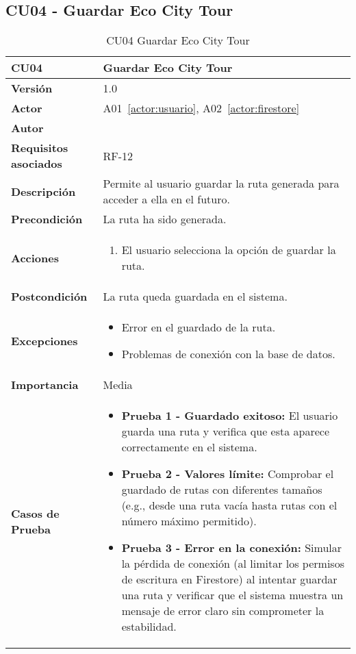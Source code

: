 \subsection{CU04 - Guardar Eco City Tour}
\begin{table}[H]
	\centering
	
	\begin{tabularx}{\linewidth}{ p{} p{} }
		\toprule
		\textbf{CU04}    & \textbf{Guardar Eco City Tour} \\
		\toprule
		\textbf{Versión}              & 1.0    \\
		\textbf{Actor}                & A01~\ref{actor:usuario}, A02~\ref{actor:firestore} \\
		\textbf{Autor}                & \autor \\
		\textbf{Requisitos asociados} & RF-12 \\
		\textbf{Descripción}          & Permite al usuario guardar la ruta generada para acceder a ella en el futuro. \\
		\textbf{Precondición}         & La ruta ha sido generada. \\
		\textbf{Acciones}             &
		\begin{enumerate}
			\def\labelenumi{\arabic{enumi}.}
			\tightlist
			\item El usuario selecciona la opción de guardar la ruta.
		\end{enumerate}\\
		\textbf{Postcondición}        & La ruta queda guardada en el sistema. \\
		\textbf{Excepciones}          & 
		\begin{itemize}
			\tightlist
			\item Error en el guardado de la ruta.
			\item Problemas de conexión con la base de datos.
		\end{itemize}\\
		\textbf{Importancia}          & Media \\
		\textbf{Casos de Prueba}      &
		\begin{itemize}
			\item \textbf{Prueba 1 - Guardado exitoso:} El usuario guarda una ruta y verifica que esta aparece correctamente en el sistema.
			\vspace{2pt}
			\item \textbf{Prueba 2 - Valores límite:} Comprobar el guardado de rutas con diferentes tamaños (e.g., desde una ruta vacía hasta rutas con el número máximo permitido).
			\vspace{2pt}
			\item \textbf{Prueba 3 - Error en la conexión:} Simular la pérdida de conexión (al limitar los permisos de escritura en Firestore) al intentar guardar una ruta y verificar que el sistema muestra un mensaje de error claro sin comprometer la estabilidad.
		\end{itemize} \\
		\bottomrule
	\end{tabularx}
	\caption{CU04 Guardar Eco City Tour}
	\label{cu:guardar-tour}
\end{table}


